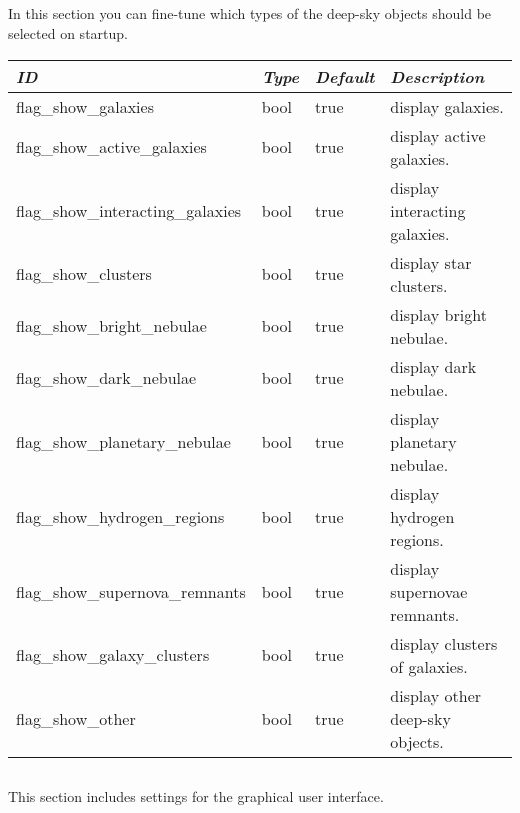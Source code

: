 \subsection{}
\label{sec:config.ini:dso_type_filters}
In this section you can fine-tune which types of the deep-sky objects should be selected on startup.

\begin{longtabu} to \textwidth {l|l|l|X}\toprule
\emph{ID} & \emph{Type} & \emph{Default} & \emph{Description}\\\midrule
flag\_show\_galaxies              & bool & true & display galaxies.\\\midrule
flag\_show\_active\_galaxies      & bool & true & display active galaxies. \\\midrule
flag\_show\_interacting\_galaxies & bool & true & display interacting galaxies.  \\\midrule
flag\_show\_clusters              & bool & true & display star clusters.  \\\midrule
flag\_show\_bright\_nebulae       & bool & true & display bright nebulae.  \\\midrule
flag\_show\_dark\_nebulae         & bool & true & display dark nebulae.  \\\midrule
flag\_show\_planetary\_nebulae    & bool & true & display planetary nebulae.  \\\midrule
flag\_show\_hydrogen\_regions     & bool & true & display hydrogen regions. \\\midrule
flag\_show\_supernova\_remnants   & bool & true & display supernovae remnants. \\\midrule
flag\_show\_galaxy\_clusters      & bool & true & display clusters of galaxies. \\\midrule
flag\_show\_other                 & bool & true & display other deep-sky objects.  \\\bottomrule
\end{longtabu}

\subsection{}\label{sec:config.ini:gui}

This section includes settings for the graphical user interface.

